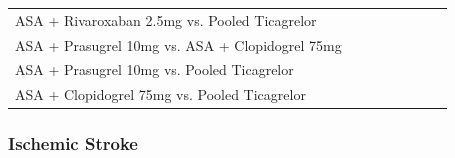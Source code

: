 \documentclass[
  12pt,
]{article}
\begin{document}
\begin{landscape}
\begin{table}[!h]
{\begin{tabular}[t]{llllllll}
ASA + Rivaroxaban 2.5mg vs. Pooled Ticagrelor & \cellcolor[HTML]{5CA881}{\textcolor{white}{No concerns}} & \cellcolor[HTML]{E7B03C}{\textcolor{white}{Suspected}} & \cellcolor[HTML]{5CA881}{\textcolor{white}{No concerns}} & \cellcolor[HTML]{E7B03C}{\textcolor{white}{Some concerns}} & \cellcolor[HTML]{B5B5B5}{Not applicable} & \cellcolor[HTML]{EA4025}{\textcolor{white}{Major concerns}} & \cellcolor[HTML]{A32A31}{\textcolor{white}{Very Low}}\\
ASA + Prasugrel 10mg vs. ASA + Clopidogrel 75mg & \cellcolor[HTML]{5CA881}{\textcolor{white}{No concerns}} & \cellcolor[HTML]{5CA881}{\textcolor{white}{Undetected}} & \cellcolor[HTML]{5CA881}{\textcolor{white}{No concerns}} & \cellcolor[HTML]{5CA881}{\textcolor{white}{No concerns}} & \cellcolor[HTML]{B5B5B5}{Not applicable} & \cellcolor[HTML]{EA4025}{\textcolor{white}{Major concerns}} & \cellcolor[HTML]{EA4025}{\textcolor{white}{Low}}\\
ASA + Prasugrel 10mg vs. Pooled Ticagrelor & \cellcolor[HTML]{5CA881}{\textcolor{white}{No concerns}} & \cellcolor[HTML]{E7B03C}{\textcolor{white}{Suspected}} & \cellcolor[HTML]{5CA881}{\textcolor{white}{No concerns}} & \cellcolor[HTML]{5CA881}{\textcolor{white}{No concerns}} & \cellcolor[HTML]{B5B5B5}{Not applicable} & \cellcolor[HTML]{EA4025}{\textcolor{white}{Major concerns}} & \cellcolor[HTML]{EA4025}{\textcolor{white}{Low}}\\
\addlinespace
ASA + Clopidogrel 75mg vs. Pooled Ticagrelor & \cellcolor[HTML]{5CA881}{\textcolor{white}{No concerns}} & \cellcolor[HTML]{E7B03C}{\textcolor{white}{Suspected}} & \cellcolor[HTML]{5CA881}{\textcolor{white}{No concerns}} & \cellcolor[HTML]{5CA881}{\textcolor{white}{No concerns}} & \cellcolor[HTML]{B5B5B5}{Not applicable} & \cellcolor[HTML]{EA4025}{\textcolor{white}{Major concerns}} & \cellcolor[HTML]{EA4025}{\textcolor{white}{Low}}\\
\bottomrule
\end{tabular}}
\end{table}

\newpage

\hypertarget{ischemic-stroke-1}{%
\subsubsection{Ischemic Stroke}\label{ischemic-stroke-1}}


\end{landscape}
\end{document}
